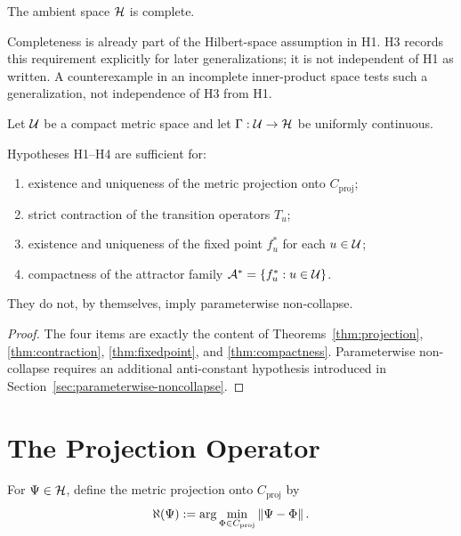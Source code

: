 \begin{hypothesis}[H3: Completeness]\label{hyp:H3}
The ambient space $\mathcal{H}$ is complete.
\end{hypothesis}

\begin{remark}
Completeness is already part of the Hilbert-space assumption in H1. H3 records this requirement explicitly for later generalizations; it is not independent of H1 as written. A counterexample in an incomplete inner-product space tests such a generalization, not independence of H3 from H1.
\end{remark}

\begin{hypothesis}\label{hyp:H4}
Let $\mathcal{U}$ be a compact metric space and let $\Gamma:\mathcal{U}\to\mathcal{H}$ be uniformly continuous.
\end{hypothesis}

\begin{proposition}\label{prop:minimal}
Hypotheses H1--H4 are sufficient for:
\begin{enumerate}[leftmargin=*]
\item existence and uniqueness of the metric projection onto ${C_{\mathrm{proj}}}$;
\item strict contraction of the transition operators $T_u$;
\item existence and uniqueness of the fixed point $f_u^\ast$ for each $u\in\mathcal{U}$;
\item compactness of the attractor family $\mathcal{A}^\ast=\{f_u^\ast:u\in\mathcal{U}\}$.
\end{enumerate}
They do not, by themselves, imply parameterwise non-collapse.
\end{proposition}

\begin{proof}
The four items are exactly the content of Theorems~\ref{thm:projection}, \ref{thm:contraction}, \ref{thm:fixedpoint}, and \ref{thm:compactness}. Parameterwise non-collapse requires an additional anti-constant hypothesis introduced in Section~\ref{sec:parameterwise-noncollapse}.
\end{proof}

\section{The Projection Operator}

\begin{definition}\label{def:projection}
For $\Psi\in\mathcal{H}$, define the metric projection onto ${C_{\mathrm{proj}}}$ by
\[
\aleph(\Psi):=\arg\min_{\Phi\in{C_{\mathrm{proj}}}}\left\lVert \Psi-\Phi \right\rVert.
\]
\end{definition}

